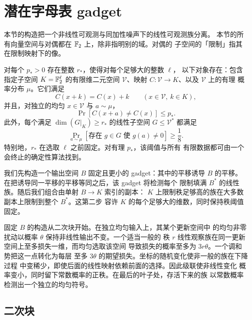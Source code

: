 \section{潜在字母表 gadget}\label{sec:latent}

本节的构造把一个非线性可观测与同加性噪声下的线性可观测族分离。
本节的所有向量空间与对偶都在 $\mathbb F_2$ 上，除非指明别的域。对偶的
子空间的「限制」指其在限制映射下的像。

\begin{lemma}\label{lem:latent}
对每个 $p_*>0$ 存在整数 $r_*$，使得对每个足够大的整数 $\ell$，
以下对象存在：包含指定子空间 $K=\mathbb F_2^\ell$ 的有限维二元空间
$\mathcal V$、映射 $C:\mathcal V\to K$、以及 $\mathcal V$ 上的有理
概率分布 $\mu$。它们满足
\begin{equation}\label{eq:latent-equivariance}
 C(x+k)=C(x)+k
 \qquad(x\in\mathcal V,\ k\in K),
\end{equation}
并且，对独立的均匀 $x\in\mathcal V$ 与 $a\sim\mu$，
\begin{equation}\label{eq:latent-small-change}
 \Pr[C(x+a)\ne C(x)]\le p_*.
\end{equation}
此外，每个满足 $\dim(G|_K)\ge r_*$ 的线性子空间
$G\le\mathcal V^*$ 都满足
\begin{equation}\label{eq:latent-detection}
 \Pr_{a\sim\mu}[\text{存在 }g\in G\text{ 使 }g(a)\ne0]
 \ge\frac18.
\end{equation}
特别地，$r_*$ 在选取 $\ell$ 之前固定。对有理 $p_*$，该阈值与所有
有限数据都可由一个会终止的确定性算法找到。
\end{lemma}

我们先构造一个输出空间 $B$ 固定且更小的 gadget：其中的平移诱导
$B$ 的平移。在把诱导同一平移的平移等同之后，该 gadget 将检测每个
限制填满 $B^*$ 的线性族。随后我们组合由单射 $B\to K$ 索引的副本：
$K$ 上限制秩足够高的族在大多数副本上限制到整个 $B^*$。这第二步
容许 $K$ 的每个足够大的维数，同时保持秩阈值固定。

固定 $B$ 的构造从二次块开始。在独立均匀输入上，其某个更新空间中
的均匀非零扰动以概率 $\theta$ 保持非线性输出不变。一个适当一般的
秩 $r$ 线性观察族在同一更新空间上至多损失一维，而均匀选取该空间
导致损失的概率至多为 $3r\theta$。一个调和势把这一点转化为每层
至多 $3\theta$ 的期望损失。坐标的随机变化使非一般的族在下降过程
中变稀少，即使后面的线性映射依赖前面的选择。因此级联使非线性变化
概率变小，同时留下常数概率的正秩。在最后的叶子处，存活下来的族
以常数概率检测出一个独立的均匀符号。

\subsection{二次块}

